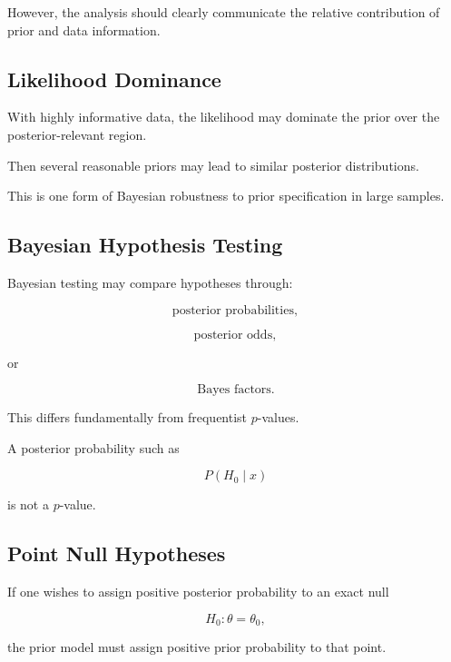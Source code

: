 However, the analysis should clearly communicate the relative
contribution of prior and data information.

\subsection{Likelihood Dominance}
\label{subsec:likelihood-dominance}

With highly informative data, the likelihood may dominate the prior over
the posterior-relevant region.

Then several reasonable priors may lead to similar posterior
distributions.

This is one form of Bayesian robustness to prior specification in large
samples.

\subsection{Bayesian Hypothesis Testing}
\label{subsec:bayesian-hypothesis-testing}

Bayesian testing may compare hypotheses through:

\[
\boxed{
\text{posterior probabilities},
}
\]

\[
\boxed{
\text{posterior odds},
}
\]

or

\[
\boxed{
\text{Bayes factors}.
}
\]

This differs fundamentally from frequentist \(p\)-values.

A posterior probability such as

\[
P(H_0\mid x)
\]

is not a \(p\)-value.

\subsection{Point Null Hypotheses}
\label{subsec:point-null-bayes}

If one wishes to assign positive posterior probability to an exact null

\[
H_0:\theta=\theta_0,
\]

the prior model must assign positive prior probability to that point.

